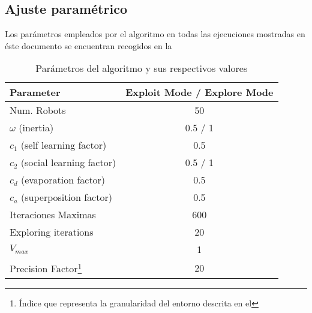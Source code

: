 \newcommand{\prefacnota}{\footnote{
		Índice que representa la granularidad del entorno descrita en el \refcruzada{Apartado}{sec:espacio}
	}}

\subsection{Ajuste paramétrico}
Los parámetros empleados por el algoritmo en todas las ejecuciones mostradas en éste documento se encuentran recogidos en la 
\begin{savenotes}
	\begin{table}[]
	   	\centering
	    \caption{Parámetros del algoritmo y sus respectivos valores}
		\begin{tabular}{|l|c|}
			\hline
			Parameter                      & Exploit Mode / Explore Mode                      \\
			\hline
			Num. Robots                    & 50                                               \\
			$\omega$ (inertia)             & 0.5 / 1                                          \\
			$c_1$ (self learning factor)   & 0.5                                              \\
			$c_2$ (social learning factor) & 0.5 / 1                                          \\
			$c_d$ (evaporation factor)     & 0.5                                              \\
			$c_a$ (superposition factor)   & 0.5                                              \\
			Iteraciones Maximas            & 600                                              \\
			Exploring iterations           & 20                                               \\
			$V_{max}$                      & 1                                                \\
			Precision Factor\prefacnota    & 20                                               \\ \hline
		\end{tabular}
    	\label{tabla:1}
	\end{table}
\end{savenotes}

